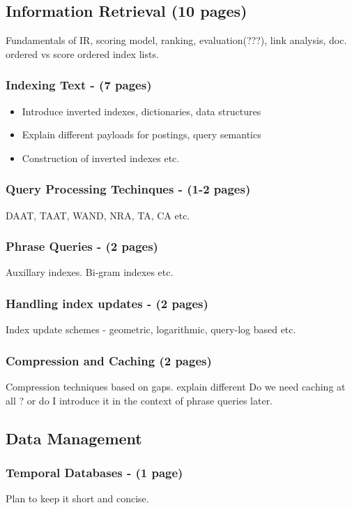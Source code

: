 \documentclass[12pt]{article}
\begin{document}
	\subsection{Information Retrieval (10 pages)}
		Fundamentals of IR, scoring model, ranking, evaluation(???), link analysis, doc. ordered vs score ordered index lists.

		\subsubsection{Indexing Text - (7 pages)}
		\begin{itemize}
			\item{Introduce inverted indexes, dictionaries, data structures}
			\item{Explain different payloads for postings, query semantics}
			\item{Construction of inverted indexes etc.}
		\end{itemize}

		\subsubsection{Query Processing Techinques - (1-2 pages)}
			DAAT, TAAT, WAND, NRA, TA, CA etc.

		\subsubsection{Phrase Queries - (2 pages)}
			Auxillary indexes. Bi-gram indexes etc.

		\subsubsection{Handling index updates - (2 pages)}
			Index update schemes - geometric, logarithmic, query-log based etc.
		\subsubsection{Compression and Caching (2 pages)}
			Compression techniques based on gaps. explain different
			Do we need caching at all ? or do I introduce it in the context of phrase queries later.


	\subsection{Data Management}
			\subsubsection{Temporal Databases - (1 page)}
			Plan to keep it short and concise. 
\end{document}
